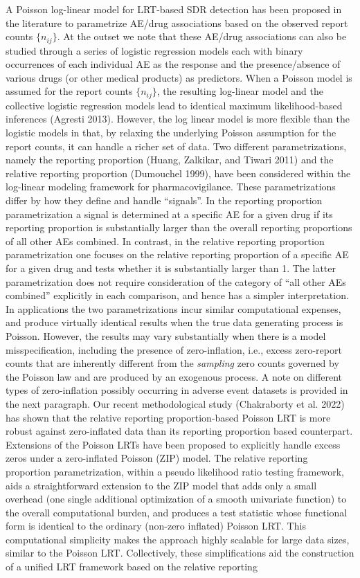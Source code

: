A Poisson log-linear model for LRT-based SDR detection has been proposed in the literature to parametrize AE/drug associations based on the observed report counts \(\{n_{ij}\}\). At the outset we note that these AE/drug associations can also be studied through a series of logistic regression models each with binary occurrences of each individual AE as the response and the presence/absence of various drugs (or other medical products) as predictors. When a Poisson model is assumed for the report counts \(\{n_{ij}\}\), the resulting log-linear model and the collective logistic regression models lead to identical maximum likelihood-based inferences (Agresti 2013). However, the log linear model is more flexible than the logistic models in that, by relaxing the underlying Poisson assumption for the report counts, it can handle a richer set of data. Two different parametrizations, namely the reporting proportion (Huang, Zalkikar, and Tiwari 2011) and the relative reporting proportion (Dumouchel 1999), have been considered within the log-linear modeling framework for pharmacovigilance. These parametrizations differ by how they define and handle ``signals''. In the reporting proportion parametrization a signal is determined at a specific AE for a given drug if its reporting proportion is substantially larger than the overall reporting proportions of all other AEs combined. In contrast, in the relative reporting proportion parametrization one focuses on the relative reporting proportion of a specific AE for a given drug and tests whether it is substantially larger than 1. The latter parametrization does not require consideration of the category of ``all other AEs combined'' explicitly in each comparison, and hence has a simpler interpretation. In applications the two parametrizations incur similar computational expenses, and produce virtually identical results when the true data generating process is Poisson. However, the results may vary substantially when there is a model misspecification, including the presence of zero-inflation, i.e., excess zero-report counts that are inherently different from the \emph{sampling} zero counts governed by the Poisson law and are produced by an exogenous process. A note on different types of zero-inflation possibly occurring in adverse event datasets is provided in the next paragraph. Our recent methodological study (Chakraborty et al. 2022) has shown that the relative reporting proportion-based Poisson LRT is more robust against zero-inflated data than its reporting proportion based counterpart. Extensions of the Poisson LRTs have been proposed to explicitly handle excess zeros under a zero-inflated Poisson (ZIP) model. The relative reporting proportion parametrization, within a pseudo likelihood ratio testing framework, aids a straightforward extension to the ZIP model that adds only a small overhead (one single additional optimization of a smooth univariate function) to the overall computational burden, and produces a test statistic whose functional form is identical to the ordinary (non-zero inflated) Poisson LRT. This computational simplicity makes the approach highly scalable for large data sizes, similar to the Poisson LRT. Collectively, these simplifications aid the construction of a unified LRT framework based on the relative reporting 
